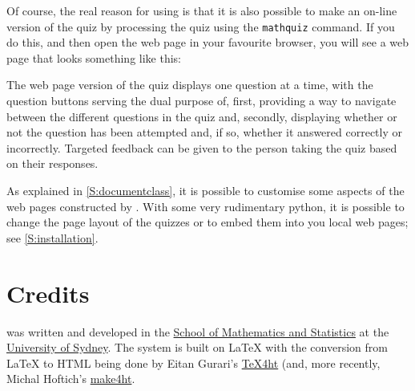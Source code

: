 \documentclass[svgnames]{article}
\begin{document}
    Of course, the real reason for using \MathQuiz is that it is also
    possible to make an on-line version of the quiz by processing the
    quiz using the \texttt{mathquiz} command. If you do this, and then open
    the web page in your favourite browser, you will see a web page
    that looks something like this:

    \begin{center}
    \end{center}

    The web page version of the quiz displays one question at a time,
    with the question buttons serving the dual purpose of, first,
    providing a way to navigate between the different questions in the
    quiz and, secondly, displaying whether or not the question has been
    attempted and, if so, whether it answered correctly or incorrectly.
    Targeted feedback can be given to the person taking the quiz based
    on their responses.

    As explained in \autoref{S:documentclass}, it is possible to
    customise some aspects of the web pages constructed by \MathQuiz.
    With some very rudimentary python, it is possible to change the page
    layout of the quizzes or to embed them into you local web pages; see
    \autoref{S:installation}.

\section{Credits}
    \MathQuiz{} was written and developed in the
    \href{http://www.maths.usyd.edu.au/}{School of Mathematics and
    Statistics} at the \href{http://www.usyd.edu.au/}{University of
    Sydney}.  The system is built on \LaTeX{} with the conversion from
    \LaTeX{} to HTML being done by Eitan Gurari's
    \href{http://www.cis.ohio-state.edu/~gurari/TeX4ht/mn.html}{TeX4ht}
    (and, more recently, Michal Hoftich's
    \href{https://github.com/michal-h21/make4ht}{make4ht}.
\end{document}
